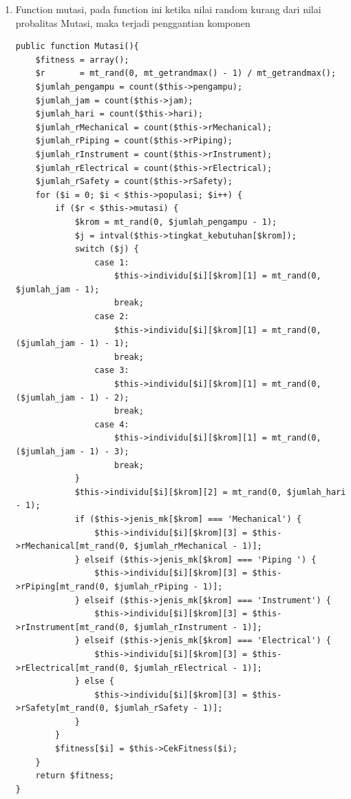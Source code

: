 \begin{enumerate}
\begin{enumerate}
	\item Function mutasi, pada function ini ketika nilai random kurang dari nilai probalitas Mutasi, maka terjadi penggantian komponen
\begin{lstlisting}
public function Mutasi(){
    $fitness = array();
    $r       = mt_rand(0, mt_getrandmax() - 1) / mt_getrandmax();
    $jumlah_pengampu = count($this->pengampu);
    $jumlah_jam = count($this->jam);
    $jumlah_hari = count($this->hari);
    $jumlah_rMechanical = count($this->rMechanical);
    $jumlah_rPiping = count($this->rPiping);
    $jumlah_rInstrument = count($this->rInstrument);
    $jumlah_rElectrical = count($this->rElectrical);
    $jumlah_rSafety = count($this->rSafety);
    for ($i = 0; $i < $this->populasi; $i++) {
        if ($r < $this->mutasi) {
            $krom = mt_rand(0, $jumlah_pengampu - 1);
            $j = intval($this->tingkat_kebutuhan[$krom]);
            switch ($j) {
                case 1:
                    $this->individu[$i][$krom][1] = mt_rand(0, $jumlah_jam - 1);
                    break;
                case 2:
                    $this->individu[$i][$krom][1] = mt_rand(0, ($jumlah_jam - 1) - 1);
                    break;
                case 3:
                    $this->individu[$i][$krom][1] = mt_rand(0, ($jumlah_jam - 1) - 2);
                    break;
                case 4:
                    $this->individu[$i][$krom][1] = mt_rand(0, ($jumlah_jam - 1) - 3);
                    break;
            }
            $this->individu[$i][$krom][2] = mt_rand(0, $jumlah_hari - 1);
            if ($this->jenis_mk[$krom] === 'Mechanical') {
                $this->individu[$i][$krom][3] = $this->rMechanical[mt_rand(0, $jumlah_rMechanical - 1)];
            } elseif ($this->jenis_mk[$krom] === 'Piping ') {
                $this->individu[$i][$krom][3] = $this->rPiping[mt_rand(0, $jumlah_rPiping - 1)];
            } elseif ($this->jenis_mk[$krom] === 'Instrument') {
                $this->individu[$i][$krom][3] = $this->rInstrument[mt_rand(0, $jumlah_rInstrument - 1)];
            } elseif ($this->jenis_mk[$krom] === 'Electrical') {
                $this->individu[$i][$krom][3] = $this->rElectrical[mt_rand(0, $jumlah_rElectrical - 1)];
            } else {
                $this->individu[$i][$krom][3] = $this->rSafety[mt_rand(0, $jumlah_rSafety - 1)];
            }
        }
        $fitness[$i] = $this->CekFitness($i);
    }
    return $fitness;
}
\end{lstlisting}
		

\end{enumerate}
\end{enumerate}
